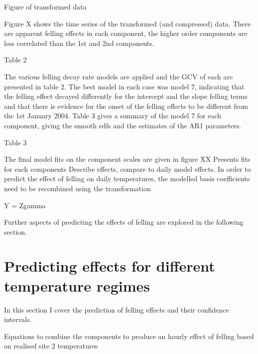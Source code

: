 Figure of transformed data

Figure X shows the time series of the transformed (and compressed) data. There are apparent felling effects in each component, the higher order components are less correlated than the 1st and 2nd components.

Table 2

The various felling decay rate models are applied and the GCV of each are presented in table 2.  The best model in each case was model 7, indicating that the felling effect decayed differently for the intercept and the slope felling terms and that there is evidence for the onset of the felling effects to be different from the 1st January 2004.  Table 3 gives a summary of the model 7 for each component, giving the smooth edfs and the estimates of the AR1 parameters.

Table 3

The final model fits on the component scales are given in figure XX
Presents fits for each components
Describe effects, compare to daily model effects.
In order to predict the effect of felling on daily temperatures, the modelled basis coefficients need to be recombined using the transformation

Y = Zgamma

Further aspects of predicting the effects of felling are explored in the following section.






\section{Predicting effects for different temperature regimes}

In this section I cover the prediction of felling effects and their confidence intervals.

Equations to combine the components to produce an hourly effect of felling based on realised site 2 temperatures

